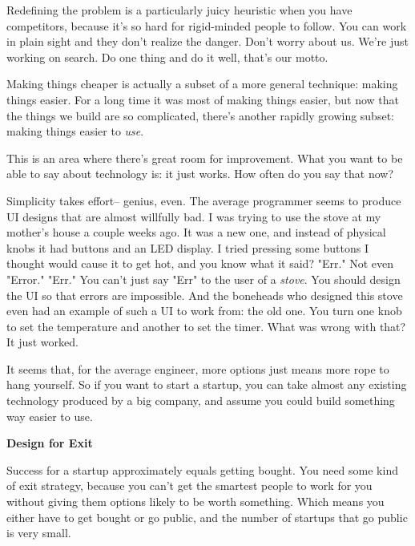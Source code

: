Redefining the problem is a
                    particularly juicy heuristic when you have competitors,
                    because it's so hard for rigid-minded people to follow. You
                    can work in plain sight and they don't realize the danger.
                    Don't worry about us. We're just working on search. Do one
                    thing and do it well, that's our motto.

Making
                    things cheaper is actually a subset of a more general
                    technique: making things easier. For a long time it was most
                    of making things easier, but now that the things we build
                    are so complicated, there's another rapidly growing subset:
                    making things easier to \emph{use}.

This is an
                    area where there's great room for improvement. What you want
                    to be able to say about technology is: it just works. How
                    often do you say that now?

Simplicity takes
                    effort-- genius, even. The average programmer seems to
                    produce UI designs that are almost willfully bad. I was
                    trying to use the stove at my mother's house a couple weeks
                    ago. It was a new one, and instead of physical knobs it had
                    buttons and an LED display. I tried pressing some buttons I
                    thought would cause it to get hot, and you know what it
                    said? "Err." Not even "Error." "Err." You can't just say
                    "Err" to the user of a \emph{stove}. You should design the
                    UI so that errors are impossible. And the boneheads who
                    designed this stove even had an example of such a UI to work
                    from: the old one. You turn one knob to set the temperature
                    and another to set the timer. What was wrong with that? It
                    just worked.

It seems that, for the average
                    engineer, more options just means more rope to hang
                    yourself. So if you want to start a startup, you can take
                    almost any existing technology produced by a big company,
                    and assume you could build something way easier to use.

\textbf{Design for Exit}

Success for a startup approximately equals
                    getting bought. You need some kind of exit strategy, because
                    you can't get the smartest people to work for you without
                    giving them options likely to be worth something. Which
                    means you either have to get bought or go public, and the
                    number of startups that go public is very small.

